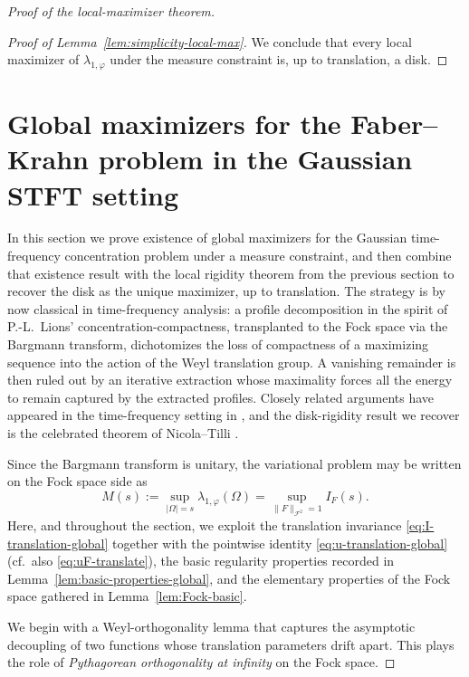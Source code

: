 \documentclass[a4paper,11pt,reqno]{amsart}
\numberwithin{equation}{section}
\theoremstyle{plain} %
\theoremstyle{definition} %
\theoremstyle{remark}
\begin{document}
\begin{proof}[Proof of the local-maximizer theorem]
\begin{proof}[Proof of Lemma~\ref{lem:simplicity-local-max}]
We conclude that every local maximizer of \(\lambda_{1,\varphi}\) under the
measure constraint is, up to translation, a disk.
\end{proof}


\section{Global maximizers for the Faber--Krahn problem in the Gaussian STFT setting}

In this section we prove existence of global maximizers for the Gaussian
time-frequency concentration problem under a measure constraint, and then
combine that existence result with the local rigidity theorem from the previous
section to recover the disk as the unique maximizer, up to translation. The
strategy is by now classical in time-frequency analysis: a profile decomposition
in the spirit of P.-L.~Lions' concentration-compactness, transplanted to the
Fock space via the Bargmann transform, dichotomizes the loss of compactness of a
maximizing sequence into the action of the Weyl translation group. A vanishing
remainder is then ruled out by an iterative extraction whose maximality forces
all the energy to remain captured by the extracted profiles. Closely related
arguments have appeared in the time-frequency setting in
\cite{Nicola-Romero-Trapasso, Marceca-Romero-Speckbacher, Fulsche-Hagger,
Samuelsen}, and the disk-rigidity result we recover is the celebrated theorem
of Nicola--Tilli \cite{Nicola-Tilli, Nicola-Tilli-2}.

Since the Bargmann transform is unitary, the variational problem may be written
on the Fock space side as
\[
M(s):=\sup_{|\Omega|=s}\lambda_{1,\varphi}(\Omega)
=
\sup_{\|F\|_{\mathcal F^2}=1} I_F(s).
\]
Here, and throughout the section, we exploit the translation invariance
\eqref{eq:I-translation-global} together with the pointwise identity
\eqref{eq:u-translation-global} (cf.\ also \eqref{eq:uF-translate}), the
basic regularity properties recorded in Lemma~\ref{lem:basic-properties-global},
and the elementary properties of the Fock space gathered in
Lemma~\ref{lem:Fock-basic}.

We begin with a Weyl-orthogonality lemma that captures the asymptotic
decoupling of two functions whose translation parameters drift apart. This
plays the role of \emph{Pythagorean orthogonality at infinity} on the Fock
space.


\end{proof}
\end{document}
